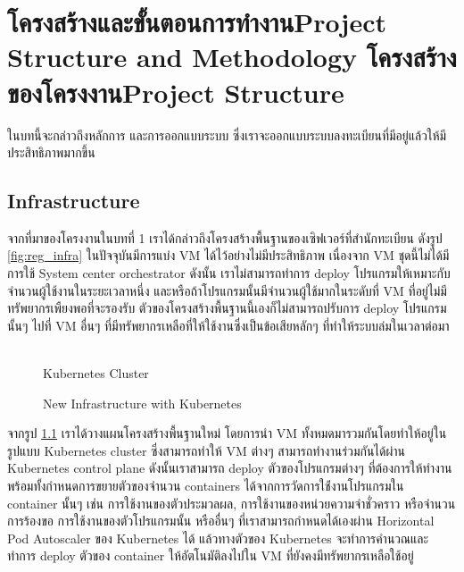 \chapter{\ifproject%
\ifcpe โครงสร้างและขั้นตอนการทำงาน\else Project Structure and Methodology\fi
\else%
\ifcpe โครงสร้างของโครงงาน\else Project Structure\fi
\fi
}

ในบทนี้จะกล่าวถึงหลักการ และการออกแบบระบบ ซึ่งเราจะออกแบบระบบลงทะเบียนที่มีอยู่แล้วให้มีประสิทธิภาพมากขึ้น

\makeatletter

\section {Infrastructure}

จากที่มาของโครงงานในบทที่ 1 เราได้กล่าวถึงโครงสร้างพื้นฐานของเซิฟเวอร์ที่สำนักทะเบียน ดังรูป \ref{fig:reg_infra} ในปัจจุบันมีการแบ่ง VM \cite{vm} ได้ไว้อย่างไม่มีประสิทธิภาพ เนื่องจาก VM ชุดนี้ไม่ได้มีการใช้ System center orchestrator \cite{sco} ดังนั้น เราไม่สามารถทำการ deploy โปรแกรมให้เหมาะกับจำนวนผู้ใช้งานในระยะเวลาหนึ่ง และหรือถ้าโปรแกรมนั้นมีจำนวนผู้ใช้มากในระดับที่ VM ที่อยู่ไม่มีทรัพยากรเพืยงพอที่จะรองรับ ตัวของโครงสร้างพื้นฐานนี้เองก็ไม่สามารถปรับการ deploy โปรแกรมนั้นๆ ไปที่ VM อื่นๆ ที่มีทรัพยากรเหลือที่ให้ใช้งานซึ่งเป็นข้อเสียหลักๆ ที่ทำให้ระบบล่มในเวลาต่อมา

\begin{figure}[h]
    \centering
    \begin{center}
     \\
    Kubernetes Cluster
    \end{center}
    \caption[Poem]{New Infrastructure with Kubernetes}
    \label{fig:new_infra}
\end{figure}

จากรูป \ref{fig:new_infra} เราได้วางแผนโครงสร้างพื้นฐานใหม่ โดยการนำ VM ทั้งหมดมารวมกันโดยทำให้อยู่ในรูปแบบ Kubernetes cluster ซึ่งสามารถทำให้ VM ต่างๆ สามารถทำงานร่วมกันได้ผ่าน Kubernetes control plane \cite{kubecomp} ดังนั้นเราสามารถ deploy ตัวของโปรแกรมต่างๆ ที่ต้องการให้ทำงานพร้อมทั้งกำหนดการขยายตัวของจำนวน containers ได้จากการวัดการใช้่งานโปรแกรมใน container นั้นๆ เช่น การใช้งานของตัวประมวลผล, การใช้งานของหน่วยความจำชั่วคราว หรือจำนวนการร้องขอ การใช้งานของตัวโปรแกรมนั้น หรืออื่นๆ ที่เราสามารถกำหนดได้เองผ่าน Horizontal Pod Autoscaler \cite{kubehpa} ของ Kubernetes ได้ แล้วทางตัวของ Kubernetes จะทำการคำนวณและทำการ deploy ตัวของ container ให้อัตโนมัติลงไปใน VM ที่ยังคงมีทรัพยากรเหลือใช้อยู่

